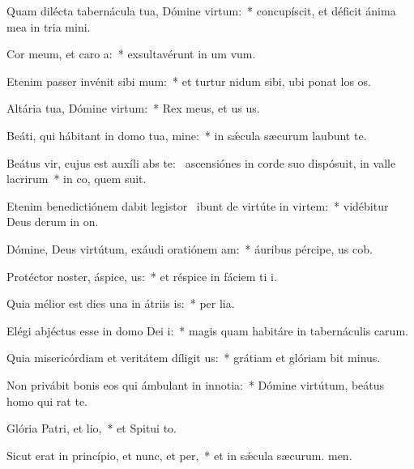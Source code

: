 \item Quam dilécta tabernácula tua, Dómine virtum:~* concupíscit, et déficit ánima mea in tria mini.
\item Cor meum, et caro a:~* exsultavérunt in um vum.
\item Etenim passer invénit sibi mum:~* et turtur nidum sibi, ubi ponat los os.
\item Altária tua, Dómine virtum:~* Rex meus, et us us.
\item Beáti, qui hábitant in domo tua, mine:~* in sǽcula sæcurum laubunt te.
\item Beátus vir, cujus est auxíli abs te:~\pscross{} ascensiónes in corde suo dispósuit, in valle lacrirum~* in co, quem suit.
\item Etenim benedictiónem dabit legistor~\pscross{} ibunt de virtúte in virtem:~* vidébitur Deus derum in on.
\item Dómine, Deus virtútum, exáudi oratiónem am:~* áuribus pércipe, us cob.
\item Protéctor noster, áspice, us:~* et réspice in fáciem ti i.
\item Quia mélior est dies una in átriis is:~* per lia.
\item Elégi abjéctus esse in domo Dei i:~* magis quam habitáre in tabernáculis carum.
\item Quia misericórdiam et veritátem díligit us:~* grátiam et glóriam bit minus.
\item Non privábit bonis eos qui ámbulant in innotia:~* Dómine virtútum, beátus homo qui rat  te.
\item Glória Patri, et lio,~* et Spitui to.
\item Sicut erat in princípio, et nunc, et per,~* et in sǽcula sæcurum. men.
